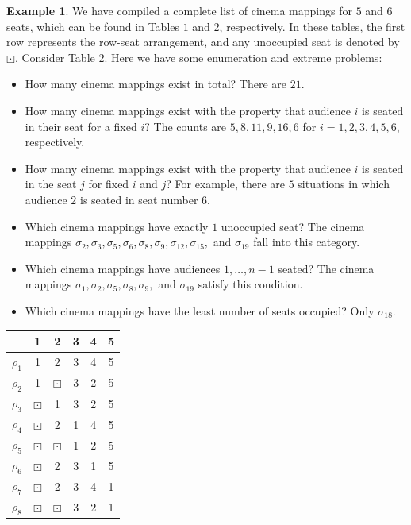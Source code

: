 \documentclass{amsart}
\theoremstyle{definition}
\newtheorem{example}[theorem]{Example}
\begin{document}
\begin{example}\label{n=5,6}
We have compiled a complete list of cinema mappings for $5$ and $6$ seats, which can be found in Tables $1$ and $2$, respectively. In these tables, the first row represents the row-seat arrangement, and any unoccupied seat is denoted by $\boxdot$. Consider Table $2$. Here we have some enumeration and extreme problems:
\begin{itemize}
\item How many cinema mappings exist in total? There are $21$.
\item How many cinema mappings exist with the property that audience $i$ is seated in their seat for a fixed $i$? The counts are $5, 8, 11, 9, 16, 6$ for $i=1, 2, 3, 4, 5, 6$, respectively.
\item How many cinema mappings exist with the property that audience $i$ is seated in the seat $j$ for fixed $i$ and $j$? For example, there are $5$ situations in which audience $2$ is seated in seat number $6$.
\item Which cinema mappings have exactly $1$ unoccupied seat? The cinema mappings $\sigma_2, \sigma_3, \sigma_5, \sigma_6, \sigma_8, \sigma_9, \sigma_{12}, \sigma_{15},$ and $\sigma_{19}$ fall into this category.
\item Which cinema mappings have audiences $1, \ldots, n-1$ seated? The cinema mappings $\sigma_1, \sigma_2, \sigma_5, \sigma_8, \sigma_9,$ and $\sigma_{19}$ satisfy this condition.
\item Which cinema mappings have the least number of seats occupied? Only $\sigma_{18}$.
\end{itemize}

\begin{table}[H]
\centering

        \begin{tabular}{ r | c c c c c}
         & 1 & 2 & 3 & 4 & 5 \\
        \hline
            $\rho_1$ & 1 & 2 & 3 & 4 & 5 \\
            $\rho_2$ & 1 & $\boxdot$ & 3 & 2 & 5 \\
            $\rho_3$ & $\boxdot$ & 1 & 3 & 2 & 5  \\
            $\rho_4$ & $\boxdot$ & 2 & 1 & 4 & 5 \\
            $\rho_5$ & $\boxdot$ & $\boxdot$ & 1 & 2 & 5 \\
            $\rho_6$ & $\boxdot$ & 2 & 3 & 1 & 5  \\
            $\rho_7$ & $\boxdot$ & 2 & 3 & 4 & 1  \\
            $\rho_8$ & $\boxdot$ & $\boxdot$ & 3 & 2 & 1
         

\end{tabular}
\end{table}
\end{example}
\end{document}
